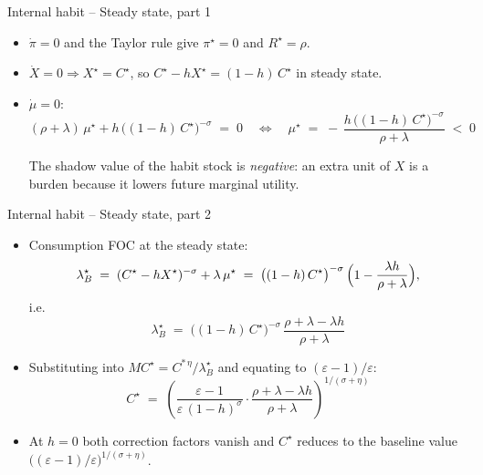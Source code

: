 \documentclass[11pt,aspectratio=169]{beamer}
\begin{document}
\begin{frame}{Internal habit -- Steady state, part 1}

\begin{itemize}

\item $\dot\pi = 0$ and the Taylor rule give $\pi^\star = 0$ and
  $R^\star = \rho$.\newline

\item $\dot X = 0 \Rightarrow X^\star = C^\star$, so $C^\star - h X^\star = (1-h)\,C^\star$ in
  steady state.\newline

\item $\dot\mu = 0$:
  \[
  (\rho + \lambda)\,\mu^\star + h\,\bigl((1-h)\,C^\star\bigr)^{-\sigma} \;=\; 0
  \quad\Longleftrightarrow\quad
  \boxed{\mu^\star \;=\; -\,\frac{h\,\bigl((1-h)\,C^\star\bigr)^{-\sigma}}{\rho + \lambda} \;<\; 0}
  \]

  The shadow value of the habit stock is \emph{negative}: an extra unit
  of $X$ is a burden because it lowers future marginal utility.

\end{itemize}

\end{frame}

\begin{frame}{Internal habit -- Steady state, part 2}

\begin{itemize}

\item Consumption FOC at the steady state:
  \[
  \lambda_B^\star \;=\; (C^\star - h X^\star)^{-\sigma} + \lambda\,\mu^\star
  \;=\; \bigl((1-h)\,C^\star\bigr)^{-\sigma}\,\Bigl(1 - \frac{\lambda h}{\rho + \lambda}\Bigr),
  \]
  i.e.
  \[
  \boxed{\lambda_B^\star \;=\; \bigl((1-h)\,C^\star\bigr)^{-\sigma}\,
  \frac{\rho + \lambda - \lambda h}{\rho + \lambda}}
  \]

\item Substituting into $MC^\star = C^{*\,\eta}/\lambda_B^\star$ and equating to
  $(\varepsilon-1)/\varepsilon$:
  \[
  \boxed{C^\star \;=\; \left(\frac{\varepsilon-1}{\varepsilon\,(1-h)^\sigma}
  \cdot \frac{\rho + \lambda - \lambda h}{\rho + \lambda}\right)^{1/(\sigma+\eta)}}
  \]

\item At $h=0$ both correction factors vanish and $C^\star$ reduces to the
  baseline value $\bigl((\varepsilon-1)/\varepsilon\bigr)^{1/(\sigma+\eta)}$.

\end{itemize}

\end{frame}
\end{document}
